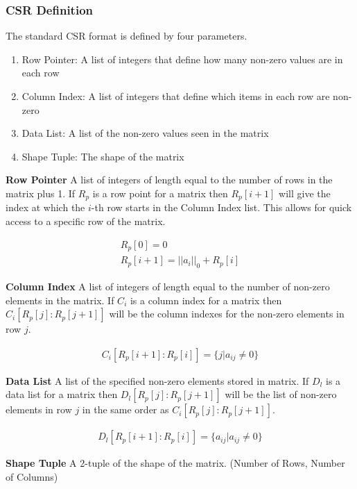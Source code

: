 \documentclass[12pt]{article}
\begin{document}
\subsubsection{CSR Definition}
The standard CSR format is defined by four parameters.
\begin{enumerate}
\item Row Pointer: A list of integers that define how many non-zero values are in each row
\item Column Index: A list of integers that define which items in each row are non-zero
\item Data List: A list of the non-zero values seen in the matrix
\item Shape Tuple: The shape of the matrix
\end{enumerate} 

\noindent
\textbf{Row Pointer}
A list of integers of length equal to the number of rows in the matrix plus 1. If $R_p$ is a row point for a matrix then $R_p[i+1]$ will give the index at which the $i$-th row starts in the Column Index list. This allows for quick access to a specific row of the matrix.
\begin{center}
	\begin{equation}
		\begin{split}
			R_p[0] = 0\\
			R_p[i+1] = ||a_i||_0 + R_p[i] 
		\end{split}
	\end{equation}
\end{center}
\noindent
\textbf{Column Index}
A list of integers of length equal to the number of non-zero elements in the matrix. If $C_i$ is a column index for a matrix then $C_i[R_p[j]:R_p[j+1]]$ will be the column indexes for the non-zero elements in row $j$.
\begin{center}
	\begin{equation}
		\begin{split}
			C_i[R_p[i+1]:R_p[i]] = \{j|a_{ij}  \neq 0\}
		\end{split}
	\end{equation}
\end{center}
\noindent
\textbf{Data List}
A list of the specified non-zero elements stored in matrix. If $D_l$ is a data list for a matrix then $D_l[R_p[j]:R_p[j+1]]$ will be the list of non-zero elements in row $j$  in the same order as $C_i[R_p[j]:R_p[j+1]]$.
\begin{center}
	\begin{equation}
		\begin{split}
			D_l[R_p[i+1]:R_p[i]] = \{a_{ij} |a_{ij}  \neq 0\}
		\end{split}
	\end{equation}
\end{center}
\noindent
\textbf{Shape Tuple}
A 2-tuple of the shape of the matrix. (Number of Rows, Number of Columns) \newline \newline
\noindent
\end{document}
